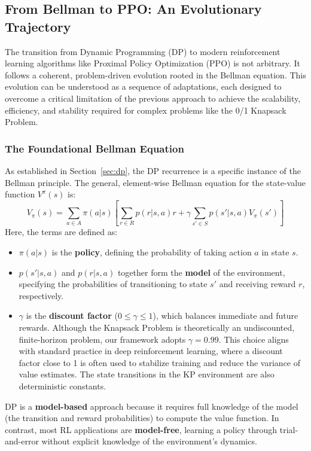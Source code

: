 \subsection{From Bellman to PPO: An Evolutionary Trajectory}
\label{sec:from-bellman-to-ppo}

The transition from Dynamic Programming (DP) to modern reinforcement learning algorithms like Proximal Policy Optimization (PPO) is not arbitrary. It follows a coherent, problem-driven evolution rooted in the Bellman equation. This evolution can be understood as a sequence of adaptations, each designed to overcome a critical limitation of the previous approach to achieve the scalability, efficiency, and stability required for complex problems like the 0/1 Knapsack Problem.

\subsubsection{The Foundational Bellman Equation}
As established in Section~\ref{sec:dp}, the DP recurrence is a specific instance of the Bellman principle. The general, element-wise Bellman equation for the state-value function \(V^\pi(s)\) is:
\begin{equation}
    \label{eq:bellman_elementwise}
    V_{\pi}(s) = \sum_{a \in A} \pi(a|s) \left[ \sum_{r \in R} p(r|s, a)r + \gamma \sum_{s' \in S} p(s'|s, a)V_{\pi}(s') \right]
\end{equation}
Here, the terms are defined as:
\begin{itemize}
    \item \(\pi(a|s)\) is the \textbf{policy}, defining the probability of taking action \(a\) in state \(s\).
    \item \(p(s'|s, a)\) and \(p(r|s, a)\) together form the \textbf{model} of the environment, specifying the probabilities of transitioning to state \(s'\) and receiving reward \(r\), respectively.
    \item \(\gamma\) is the \textbf{discount factor} (\(0 \le \gamma \le 1\)), which balances immediate and future rewards. Although the Knapsack Problem is theoretically an undiscounted, finite-horizon problem, our framework adopts \(\gamma = 0.99\). This choice aligns with standard practice in deep reinforcement learning, where a discount factor close to 1 is often used to stabilize training and reduce the variance of value estimates. The state transitions in the KP environment are also deterministic constants.\end{itemize}
DP is a \textbf{model-based} approach because it requires full knowledge of the model (the transition and reward probabilities) to compute the value function. In contrast, most RL applications are \textbf{model-free}, learning a policy through trial-and-error without explicit knowledge of the environment's dynamics.

